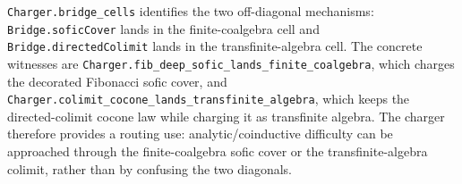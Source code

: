 \begin{theorem}\label{thm:finite-infinite-charger-bridges}\leanok{}
\texttt{Charger.bridge\_cells} identifies the two off-diagonal mechanisms:
\texttt{Bridge.soficCover} lands in the finite-coalgebra cell and
\texttt{Bridge.directedColimit} lands in the transfinite-algebra cell.
The concrete witnesses are \texttt{Charger.fib\_deep\_sofic\_lands\_finite\_coalgebra},
which charges the decorated Fibonacci sofic cover, and
\texttt{Charger.colimit\_cocone\_lands\_transfinite\_algebra}, which keeps the
directed-colimit cocone law while charging it as transfinite algebra.  The
charger therefore provides a routing use: analytic/coinductive difficulty can be
approached through the finite-coalgebra sofic cover or the transfinite-algebra
colimit, rather than by confusing the two diagonals.
\end{theorem}
